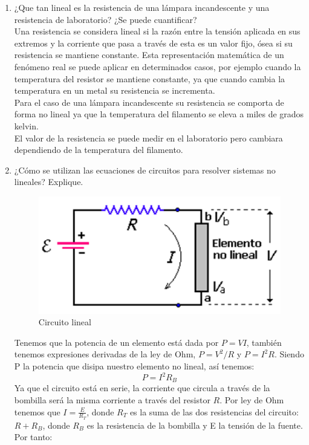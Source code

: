 \documentclass[twocolumn]{IEEEtran}
\begin{document}
\begin{enumerate}
 \item ¿Que  tan  lineal  es  la  resistencia  de  una  lámpara  incandescente  y  una  resistencia  de  laboratorio? ¿Se  puede  cuantificar?\\
Una resistencia se considera lineal si la razón entre la tensión aplicada en sus extremos y  la corriente que pasa a través de esta es un valor fijo, ósea si su resistencia se mantiene constante. Esta representación matemática de un fenómeno real   se puede aplicar en determinados casos, por ejemplo cuando la temperatura del resistor se mantiene constante, ya que cuando cambia la temperatura en un metal  su  resistencia se incrementa.\\
Para el caso de una lámpara incandescente su resistencia se comporta de forma no lineal ya que la temperatura del filamento se eleva a miles de grados kelvin.\\
El valor de la resistencia se puede medir en el laboratorio pero cambiara dependiendo de la temperatura del filamento.
 \item ¿Cómo se utilizan las ecuaciones de circuitos para resolver sistemas no lineales? Explique.
\begin{figure}[H]
	\centering
		\includegraphics[scale=0.5]{l1.png}
	\caption{Circuito lineal}
	\label{fig8}
\end{figure}
Tenemos que la potencia de un elemento está dada por $P=VI$, también tenemos expresiones derivadas de la ley de Ohm, $P=V^2/R$ y $P=I^2R$. Siendo P la potencia que disipa nuestro elemento no lineal, así  tenemos:
\begin{equation}
 P = I^2 R_B
\label{ecu10}
\end{equation}
\noindent
Ya que el circuito está en serie, la corriente que circula a través de la bombilla será la misma corriente a través del resistor $R$. Por ley de Ohm tenemos que  $I = \frac{E}{R_T}$, donde $R_T$ es la suma de las dos resistencias del circuito: $R + R_B$, donde $R_B$ es la resistencia de la bombilla y E la tensión de la fuente. Por tanto:

\end{enumerate}
\end{document}
